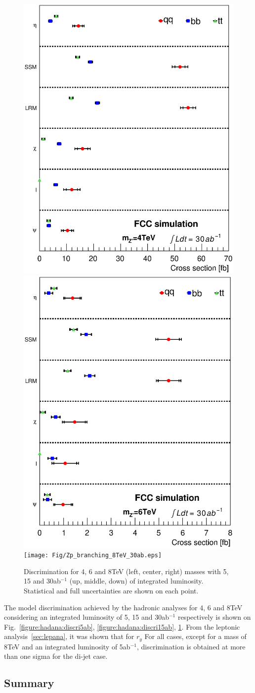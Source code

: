 \begin{figure}[h]
    \includegraphics[width=0.3\columnwidth]{Fig/Zp_branching_4TeV_30ab.eps}
    \includegraphics[width=0.3\columnwidth]{Fig/Zp_branching_6TeV_30ab.eps}
    \texttt{[image: Fig/Zp\_branching\_8TeV\_30ab.eps]}
  \caption{Discrimination for 4, 6 and 8TeV (left, center, right) masses with 5, 15 and 30ab$^{-1}$ (up, middle, down) of integrated luminosity. Statistical and full uncertainties are shown on each point.}
  \label{figure:hadana:discri30ab}
\end{figure}

The model discrimination achieved by the hadronic analyses for 4, 6 and 8TeV considering an integrated luminosity of 
5, 15 and 30ab$^{-1}$ respectively is shown on Fig.~\ref{figure:hadana:discri5ab}, \ref{figure:hadana:discri15ab}, \ref{figure:hadana:discri30ab}.
From the leptonic analysis~\ref{sec:lepana}, it was shown that for $r_y$ 
For all cases, except for a mass of 8TeV and an integrated luminosity of 5ab$^{-1}$, discrimination is obtained at more than one sigma for the di-jet case.


\subsection{Summary}
